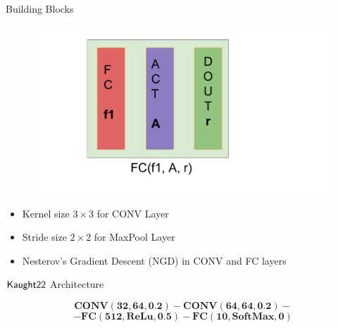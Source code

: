 \documentclass[20pt]{beamer}
\newlength{\onecolwid}
\newcommand*{\K}{\ensuremath{\mathsf{Kaught22}}}
\begin{document}
\begin{frame}[t]
\begin{columns}[t]
\begin{column}{\onecolwid}
\begin{block}{Building Blocks}
\begin{minipage}{0.45\onecolwid}
	\begin{figure}
	\centering
	\includegraphics[scale=0.7, trim={30cm, 1cm, 30cm, 1cm}]{Images/FCB.pdf}
	\end{figure}
\end{minipage}
\hfill
\begin{minipage}{0.45\onecolwid}
\begin{itemize}
\item Kernel size $3\times 3$ for CONV Layer 
\item Stride size $2\times 2$ for MaxPool Layer 
\end{itemize}
\end{minipage}
\hfill
\begin{minipage}{0.45\onecolwid}
\begin{itemize}
\item Nesterov's  Gradient Descent (NGD) in CONV and FC layers
\end{itemize}
\end{minipage}

\end{block}

\begin{block}{$\textbf{\K}$ Architecture}

\[
\textbf{CONV}(\textbf{32}, \textbf{64}, \textbf{0.2})-\textbf{CONV}(\textbf{64}, \textbf{64}, \textbf{0.2}) - \]
\[ - \textbf{FC}(\textbf{512}, \textbf{ReLu}, \textbf{0.5}) - \textbf{FC}(\textbf{10}, \textbf{SoftMax}, \textbf{0})
\]

\end{block}


\end{column}
\end{columns}
\end{frame}
\end{document}
